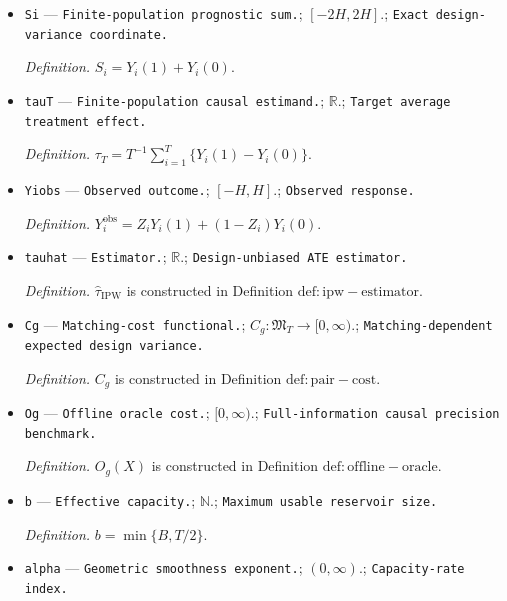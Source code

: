\documentclass{article}
\begin{document}
\begin{itemize}
  \par\smallskip\noindent\emph{Definition.} If arrival \(i\) is stored, \(Z_i\) is assigned immediately by a private fair coin. If later arrival \(i_k\) completes an edge with stored member \(j_k\), then \(Z_{i_k}=1-Z_{j_k}\), equivalently \(Z_{j_k}=(1+\varepsilon_k)/2\) and \(Z_{i_k}=(1-\varepsilon_k)/2\).
  \item \texttt{Si} --- \texttt{Finite-\allowbreak{}population prognostic sum.}; \([-2H,2H]\).; \texttt{Exact design-\allowbreak{}variance coordinate.}
  \par\smallskip\noindent\emph{Definition.} \(S_i=Y_i(1)+Y_i(0)\).
  \item \texttt{tauT} --- \texttt{Finite-\allowbreak{}population causal estimand.}; \(\mathbb R\).; \texttt{Target average treatment effect.}
  \par\smallskip\noindent\emph{Definition.} \(\tau_T=T^{-1}\sum_{i=1}^T\{Y_i(1)-Y_i(0)\}\).
  \item \texttt{Yiobs} --- \texttt{Observed outcome.}; \([-H,H]\).; \texttt{Observed response.}
  \par\smallskip\noindent\emph{Definition.} \(Y_i^{\mathrm{obs}}=Z_iY_i(1)+(1-Z_i)Y_i(0)\).
  \item \texttt{tauhat} --- \texttt{Estimator.}; \(\mathbb R\).; \texttt{Design-\allowbreak{}unbiased ATE estimator.}
  \par\smallskip\noindent\emph{Definition.} \(\widehat\tau_{\mathrm{IPW}}\) is constructed in Definition \(\mathrm{def:ipw-estimator}\).
  \item \texttt{Cg} --- \texttt{Matching-\allowbreak{}cost functional.}; \(C_g:\mathfrak M_T\to[0,\infty)\).; \texttt{Matching-\allowbreak{}dependent expected design variance.}
  \par\smallskip\noindent\emph{Definition.} \(C_g\) is constructed in Definition \(\mathrm{def:pair-cost}\).
  \item \texttt{Og} --- \texttt{Offline oracle cost.}; \([0,\infty)\).; \texttt{Full-\allowbreak{}information causal precision benchmark.}
  \par\smallskip\noindent\emph{Definition.} \(O_g(X)\) is constructed in Definition \(\mathrm{def:offline-oracle}\).
  \item \texttt{b} --- \texttt{Effective capacity.}; \(\mathbb N\).; \texttt{Maximum usable reservoir size.}
  \par\smallskip\noindent\emph{Definition.} \(b=\min\{B,T/2\}\).
  \item \texttt{alpha} --- \texttt{Geometric smoothness exponent.}; \((0,\infty)\).; \texttt{Capacity-\allowbreak{}rate index.}

\end{itemize}
\end{document}
